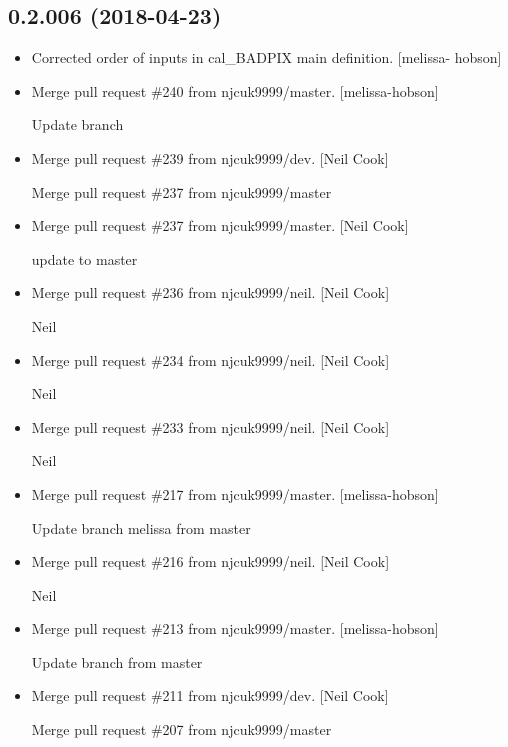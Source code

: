 \documentclass[a4paper,10pt,english]{report}
\begin{document}
\subsection{0.2.006 (2018-04-23)}
\label{\detokenize{misc/changelog:id454}}\begin{itemize}
\item {} 
Corrected order of inputs in cal\_BADPIX main definition. {[}melissa-
hobson{]}

\item {} 
Merge pull request \#240 from njcuk9999/master. {[}melissa-hobson{]}

Update branch

\item {} 
Merge pull request \#239 from njcuk9999/dev. {[}Neil Cook{]}

Merge pull request \#237 from njcuk9999/master

\item {} 
Merge pull request \#237 from njcuk9999/master. {[}Neil Cook{]}

update to master

\item {} 
Merge pull request \#236 from njcuk9999/neil. {[}Neil Cook{]}

Neil

\item {} 
Merge pull request \#234 from njcuk9999/neil. {[}Neil Cook{]}

Neil

\item {} 
Merge pull request \#233 from njcuk9999/neil. {[}Neil Cook{]}

Neil

\item {} 
Merge pull request \#217 from njcuk9999/master. {[}melissa-hobson{]}

Update branch melissa from master

\item {} 
Merge pull request \#216 from njcuk9999/neil. {[}Neil Cook{]}

Neil

\item {} 
Merge pull request \#213 from njcuk9999/master. {[}melissa-hobson{]}

Update branch from master

\item {} 
Merge pull request \#211 from njcuk9999/dev. {[}Neil Cook{]}

Merge pull request \#207 from njcuk9999/master


\end{itemize}
\end{document}
